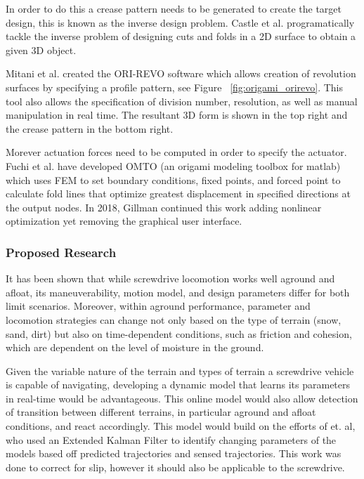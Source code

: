 In order to do this a crease pattern needs to be generated to create the target design, this is known as the inverse design problem. Castle et al. \cite{Castle2014} programatically tackle the inverse problem of designing cuts and folds in a 2D surface to obtain a given 3D object. 

Mitani et al. \cite{Mitani2009} created the ORI-REVO software which allows creation of revolution surfaces by specifying a profile pattern, see Figure ~\ref{fig:origami_orirevo}. This tool also allows the specification of division number, resolution, as well as manual manipulation in real time. The resultant 3D form is shown in the top right and the crease pattern in the bottom right. %

Morever actuation forces need to be computed in order to specify the actuator. Fuchi et al. \cite{Fuchi2013} have developed OMTO (an origami modeling toolbox for matlab) which uses FEM to set boundary conditions, fixed points, and forced point to calculate fold lines that optimize greatest displacement in specified directions at the output nodes. In 2018, Gillman \cite{Gillman2018} continued this work adding nonlinear optimization yet removing the graphical user interface. 

\subsubsection{Proposed Research}

It has been shown that while screwdrive locomotion works well aground and afloat, its maneuverability, motion model, and design parameters differ for both limit scenarios. Moreover, within aground performance, parameter and locomotion strategies can change not only based on the type of terrain (snow, sand, dirt) but also on time-dependent conditions, such as friction and cohesion, which are dependent on the level of moisture in the ground.

Given the variable nature of the terrain and types of terrain a screwdrive vehicle is capable of navigating, developing a dynamic model that learns its parameters in real-time would be advantageous. This online model would also allow detection of transition between different terrains, in particular aground and afloat conditions, and react accordingly. This model would build on the efforts of \cite{Rogers-Marcovitz2014} et. al, who used an Extended Kalman Filter to identify changing parameters of the models based off predicted trajectories and sensed trajectories. This work was done to correct for slip, however it should also be applicable to the screwdrive. 


